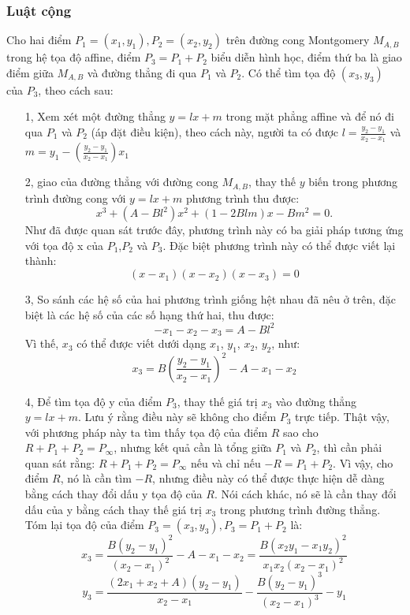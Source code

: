 \documentclass[a4paper,12pt]{report}
\begin{document}
\subsubsection*{Luật cộng}
Cho hai điểm $P_{1} = (x_{1}, y_{1}), P_{2}=(x_{2},y_{2})$ trên đường cong Montgomery $M_{A, B}$ trong hệ tọa độ affine, điểm $P_{3} = P_{1} + P_{2}$ biểu diễn hình học, điểm thứ ba là giao điểm giữa $M_{A, B}$ và đường thẳng đi qua $P_{1}$ và $P_{2}$. Có thể tìm tọa độ $(x_3, y_3)$ của $P_{3}$, theo cách sau:
\begin{itemize}
\item[1, ] Xem xét một đường thẳng $y = lx + m$ trong mặt phẳng affine và để nó đi qua $P_{1}$ và $P_{2}$ (áp đặt điều kiện), theo cách này, người ta có được $\displaystyle{l = \frac {y_{2} - y_{1}}{x_{2} - x_{1}}}$ và $\displaystyle{m = y_ {1} - \left({\frac {y_ {2} -y_ {1}} {x_ {2} -x_ {1}}} \right)x_{1}}$
\item[2, ] giao của đường thẳng với đường cong $M_{A, B}$, thay thế $y$ biến trong phương trình đường cong với $y = lx + m$ phương trình thu được:
\begin{displaymath}
x^3 + (A - Bl^2)x^2 + (1 - 2Blm)x - Bm^2 = 0.
\end{displaymath}
Như đã được quan sát trước đây, phương trình này có ba giải pháp tương ứng với tọa độ x của $P_{1}$,$P_{2}$ và $P_{3}$. Đặc biệt phương trình này có thể được viết lại thành:
\begin{displaymath}
(x - x_1)(x - x_2)(x - x_3) = 0
\end{displaymath}
\item[3, ] So sánh các hệ số của hai phương trình giống hệt nhau đã nêu ở trên, đặc biệt là các hệ số của các số hạng thứ hai, thu được:
\begin{displaymath}
-x_1 - x_2 - x_3 = A - Bl^2
\end{displaymath}
Vì thế, $x_3$ có thể được viết dưới dạng $x_{1}$, $y_{1}$, $x_{2}$, $y_{2}$, như:
\begin{displaymath}
x_3 = B\left(\frac{y_2 - y_1}{x_2 - x_1} \right)^2 - A - x_1 - x_2
\end{displaymath}
\item[4, ] Để tìm tọa độ y của điểm $P_{3}$, thay thế giá trị $x_{3}$ vào đường thẳng $y = lx + m$. Lưu ý rằng điều này sẽ không cho điểm $P_{3}$ trực tiếp. Thật vậy, với phương pháp này ta tìm thấy tọa độ của điểm $R$ sao cho $R + P_1 + P_2 = P_\infty$, nhưng  kết quả cần là tổng giữa $P_{1}$ và $P_{2}$, thì cần phải quan sát rằng: $R + P_1 + P_2 = P_\infty$ nếu và chỉ nếu $-R = P_1 + P_2$. Vì vậy, cho điểm $R$, nó là cần tìm $-R$, nhưng điều này có thể được thực hiện dễ dàng bằng cách thay đổi dấu y tọa độ của $R$. Nói cách khác, nó sẽ là cần thay đổi dấu của y bằng cách thay thế giá trị  $x_{3}$ trong phương trình đường thẳng.
Tóm lại tọa độ của điểm $P_3 = (x_3, y_3), P_3 = P_1 + P_2$ là:
\begin{displaymath}
x_3 = \frac{B(y_2-y_1)^2}{(x_2-x_1)^2}-A-x_1-x_2=\frac{B(x_2y_1-x_1y_2)^2}{x_1x_2(x_2-x_1)^2}
\end{displaymath}
\begin{displaymath}
y_3 = \frac{(2x_1+x_2+A)(y_2-y_1)}{x_2-x_1}-\frac{B(y_2-y_1)^3}{(x_2-x_1)^3}-y_1
\end{displaymath}
\end{itemize}
\end{document}
